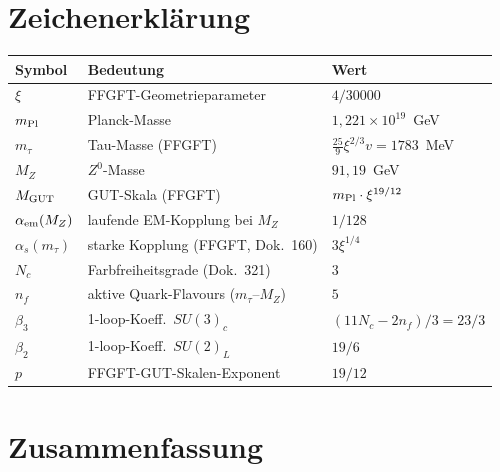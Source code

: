 %

\section*{Zeichenerklärung}

\begin{center}
\begin{tabular}{lll}
\toprule
Symbol & Bedeutung & Wert \\
\midrule
$\xi$ & FFGFT-Geometrieparameter & $4/30000$ \\
$m_{\rm Pl}$ & Planck-Masse & $1{,}221\times10^{19}$~GeV \\
$m_\tau$ & Tau-Masse (FFGFT) & $\frac{25}{9}\xi^{2/3}v = 1783$~MeV \\
$M_Z$ & $Z^0$-Masse & $91{,}19$~GeV \\
$M_{\rm GUT}$ & GUT-Skala (FFGFT) & $m_{\rm Pl}\cdot\xi^{19/12}$ \\
$\alpha_{\rm em}(M_Z)$ & laufende EM-Kopplung bei $M_Z$ & $1/128$ \\
$\alpha_s(m_\tau)$ & starke Kopplung (FFGFT, Dok.~160) & $3\xi^{1/4}$ \\
$N_c$ & Farbfreiheitsgrade (Dok.~321) & $3$ \\
$n_f$ & aktive Quark-Flavours ($m_\tau$--$M_Z$) & $5$ \\
$\beta_3$ & 1-loop-Koeff.\ $SU(3)_c$ & $(11N_c-2n_f)/3 = 23/3$ \\
$\beta_2$ & 1-loop-Koeff.\ $SU(2)_L$ & $19/6$ \\
$p$ & FFGFT-GUT-Skalen-Exponent & $19/12$ \\
\bottomrule
\end{tabular}
\end{center}



\section*{Zusammenfassung}

